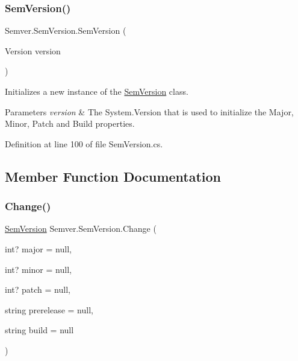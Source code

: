 \subsubsection{\texorpdfstring{SemVersion()}{SemVersion()}\hspace{0.1cm}{\footnotesize\ttfamily [2/2]}}
{\footnotesize\ttfamily Semver.\+Sem\+Version.\+Sem\+Version (\begin{DoxyParamCaption}\item[{Version}]{version }\end{DoxyParamCaption})}



Initializes a new instance of the \mbox{\hyperlink{class_semver_1_1_sem_version}{Sem\+Version}} class. 


\begin{DoxyParams}{Parameters}
{\em version} & The System.\+Version that is used to initialize the Major, Minor, Patch and Build properties.\\
\hline
\end{DoxyParams}


Definition at line 100 of file Sem\+Version.\+cs.



\subsection{Member Function Documentation}
\mbox{\label{class_semver_1_1_sem_version_a5d3a10589ea96a59aed64d65ab5f9c24}} 
\subsubsection{\texorpdfstring{Change()}{Change()}}
{\footnotesize\ttfamily \mbox{\hyperlink{class_semver_1_1_sem_version}{Sem\+Version}} Semver.\+Sem\+Version.\+Change (\begin{DoxyParamCaption}\item[{int?}]{major = {\ttfamily null},  }\item[{int?}]{minor = {\ttfamily null},  }\item[{int?}]{patch = {\ttfamily null},  }\item[{string}]{prerelease = {\ttfamily null},  }\item[{string}]{build = {\ttfamily null} }\end{DoxyParamCaption})}



